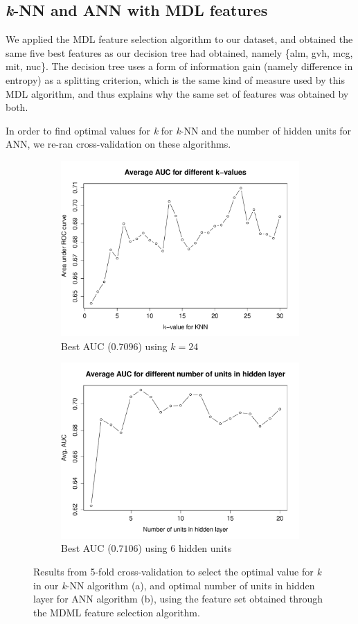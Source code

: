 \documentclass{article}
\begin{document}
\subsection{\textit{k}-NN and ANN with MDL features}

We applied the MDL feature selection algorithm to our dataset, and obtained the same five best features as our decision tree had obtained, namely \{alm, gvh, mcg, mit, nuc\}. The decision tree uses a form of information gain (namely difference in entropy) as a splitting criterion, which is the same kind of measure used by this MDL algorithm, and thus explains why the same set of features was obtained by both.

In order to find optimal values for \textit{k} for \textit{k}-NN and the number of hidden units for ANN, we re-ran cross-validation on these algorithms.

\begin{figure}[htbp]
\centering
\begin{subfigure}{.5\textwidth}
  \centering
  \includegraphics[width=.8\linewidth]{figures/knn-mdl.pdf}
  \caption{Best AUC ($0.7096$) using $k=24$}
  \label{fig:sub1}
\end{subfigure}%
\begin{subfigure}{.5\textwidth}
  \centering
  \includegraphics[width=.8\linewidth]{figures/ann-mdl.pdf}
  \caption{Best AUC ($0.7106$) using 6 hidden units}
  \label{fig:sub2}
\end{subfigure}
\caption{Results from 5-fold cross-validation to select the optimal value for \textit{k} in our \textit{k}-NN algorithm (a), and optimal number of units in hidden layer for ANN algorithm (b), using the feature set obtained through the MDML feature selection algorithm.}
\label{fig:test}
\end{figure}
\end{document}
